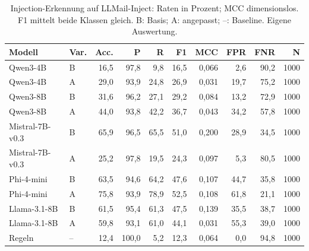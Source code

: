 \begin{table}[htbp]
\centering\scriptsize
\caption{Injection-Erkennung auf LLMail-Inject: Raten in Prozent; MCC dimensionslos. F1 mittelt beide Klassen gleich. B: Basis; A: angepasst; –: Baseline. Eigene Auswertung.}
\label{tab:result-injection-4}
\begin{tabular}{llrrrrrrrr}
\toprule
Modell & Var. & Acc. & P & R & F1 & MCC & FPR & FNR & N \\
\midrule
Qwen3-4B & B & 16{,}5 & 97{,}8 & 9{,}8 & 16{,}5 & 0{,}066 & 2{,}6 & 90{,}2 & 1000 \\
Qwen3-4B & A & 29{,}0 & 93{,}9 & 24{,}8 & 26{,}9 & 0{,}031 & 19{,}7 & 75{,}2 & 1000 \\
Qwen3-8B & B & 31{,}6 & 96{,}2 & 27{,}1 & 29{,}2 & 0{,}084 & 13{,}2 & 72{,}9 & 1000 \\
Qwen3-8B & A & 44{,}0 & 93{,}8 & 42{,}2 & 36{,}7 & 0{,}043 & 34{,}2 & 57{,}8 & 1000 \\
Mistral-7B-v0.3 & B & 65{,}9 & 96{,}5 & 65{,}5 & 51{,}0 & 0{,}200 & 28{,}9 & 34{,}5 & 1000 \\
Mistral-7B-v0.3 & A & 25{,}2 & 97{,}8 & 19{,}5 & 24{,}3 & 0{,}097 & 5{,}3 & 80{,}5 & 1000 \\
Phi-4-mini & B & 63{,}5 & 94{,}6 & 64{,}2 & 47{,}6 & 0{,}107 & 44{,}7 & 35{,}8 & 1000 \\
Phi-4-mini & A & 75{,}8 & 93{,}9 & 78{,}9 & 52{,}5 & 0{,}108 & 61{,}8 & 21{,}1 & 1000 \\
Llama-3.1-8B & B & 61{,}5 & 95{,}4 & 61{,}3 & 47{,}5 & 0{,}139 & 35{,}5 & 38{,}7 & 1000 \\
Llama-3.1-8B & A & 59{,}8 & 93{,}1 & 61{,}0 & 44{,}1 & 0{,}031 & 55{,}3 & 39{,}0 & 1000 \\
Regeln & – & 12{,}4 & 100{,}0 & 5{,}2 & 12{,}3 & 0{,}064 & 0{,}0 & 94{,}8 & 1000 \\
\bottomrule
\end{tabular}
\end{table}
